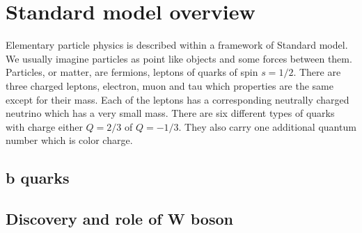 \section{Standard model overview}

Elementary particle physics is described within a framework of Standard model. We usually imagine particles as point like objects and some forces between them. Particles, or matter, are fermions, leptons of quarks of spin $s=1/2$. There are three charged leptons, electron, muon and tau which properties are the same except for their mass. Each of the leptons has a corresponding neutrally charged neutrino which has a very small mass. There are six different types of quarks with charge either $Q=2/3$ of $Q=-1/3$. They also carry one additional quantum number which is color charge.      

\subsection{b quarks}
\subsection{Discovery and role of W boson}



